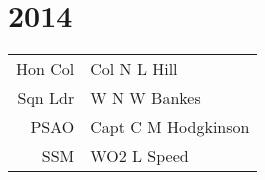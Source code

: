 \chapter*{2014}

\vspace*{20mm}

\begin{center}
  \begin{tabular}{rl}
    Hon Col & Col N L Hill \\
    Sqn Ldr & W N W Bankes \\
    PSAO & Capt C M Hodgkinson \\
    SSM & WO2 L Speed \\
  \end{tabular}
\end{center}
